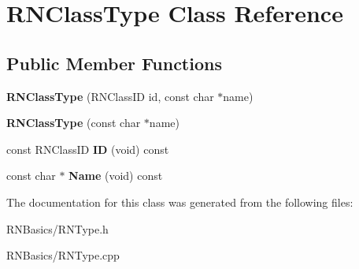 \hypertarget{class_r_n_class_type}{}\section{R\+N\+Class\+Type Class Reference}
\label{class_r_n_class_type}
\subsection*{Public Member Functions}
\begin{DoxyCompactItemize}
\item 
{\bfseries R\+N\+Class\+Type} (R\+N\+Class\+ID id, const char $\ast$name)\hypertarget{class_r_n_class_type_ae1726e946299d3de1bdd98261717a5ca}{}\label{class_r_n_class_type_ae1726e946299d3de1bdd98261717a5ca}

\item 
{\bfseries R\+N\+Class\+Type} (const char $\ast$name)\hypertarget{class_r_n_class_type_af10d93d061922d22b05a2bba6073d027}{}\label{class_r_n_class_type_af10d93d061922d22b05a2bba6073d027}

\item 
const R\+N\+Class\+ID {\bfseries ID} (void) const \hypertarget{class_r_n_class_type_abcc223cb3463769221967ca9814c6a78}{}\label{class_r_n_class_type_abcc223cb3463769221967ca9814c6a78}

\item 
const char $\ast$ {\bfseries Name} (void) const \hypertarget{class_r_n_class_type_a0558e2d29043812de8ce77e62978e0b8}{}\label{class_r_n_class_type_a0558e2d29043812de8ce77e62978e0b8}

\end{DoxyCompactItemize}


The documentation for this class was generated from the following files\+:\begin{DoxyCompactItemize}
\item 
R\+N\+Basics/R\+N\+Type.\+h\item 
R\+N\+Basics/R\+N\+Type.\+cpp\end{DoxyCompactItemize}

